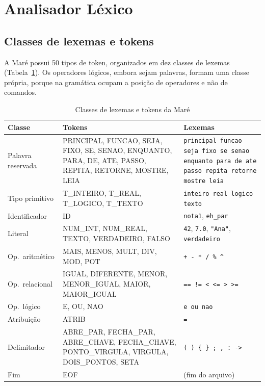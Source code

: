 \documentclass[conference]{IEEEtran}
\begin{document}
\section{Analisador Léxico}\label{sec:lex}

\subsection{Classes de lexemas e tokens}
A Maré possui 50 tipos de token, organizados em dez classes de lexemas
(Tabela~\ref{tab:tokens}). Os operadores lógicos, embora sejam palavras,
formam uma classe própria, porque na gramática ocupam a posição de operadores
e não de comandos.

\begin{table}[!t]
\caption{Classes de lexemas e tokens da Maré}\label{tab:tokens}
\centering\scriptsize
\setlength{\tabcolsep}{3pt}
\begin{tabular}{@{}>{\raggedright\arraybackslash}p{1.75cm}>{\raggedright\arraybackslash}p{3.3cm}>{\raggedright\arraybackslash}p{2.75cm}@{}}
\toprule
\textbf{Classe} & \textbf{Tokens} & \textbf{Lexemas} \\
\midrule
Palavra reservada & PRINCIPAL, FUNCAO, SEJA, FIXO, SE, SENAO, ENQUANTO,
  PARA, DE, ATE, PASSO, REPITA, RETORNE, MOSTRE, LEIA
  & \texttt{principal funcao seja fixo se senao enquanto para de ate passo
  repita retorne mostre leia} \\
Tipo primitivo & T\_INTEIRO, T\_REAL, T\_LOGICO, T\_TEXTO
  & \texttt{inteiro real logico texto} \\
Identificador & ID & \texttt{nota1}, \texttt{eh\_par} \\
Literal & NUM\_INT, NUM\_REAL, TEXTO, VERDADEIRO, FALSO
  & \texttt{42}, \texttt{7.0}, \texttt{"Ana"}, \texttt{verdadeiro} \\
Op.\ aritmético & MAIS, MENOS, MULT, DIV, MOD, POT & \texttt{+ - * / \% \^{}} \\
Op.\ relacional & IGUAL, DIFERENTE, MENOR, MENOR\_IGUAL, MAIOR, MAIOR\_IGUAL
  & \texttt{== != < <= > >=} \\
Op.\ lógico & E, OU, NAO & \texttt{e ou nao} \\
Atribuição & ATRIB & \texttt{=} \\
Delimitador & ABRE\_PAR, FECHA\_PAR, ABRE\_CHAVE, FECHA\_CHAVE,
  PONTO\_VIRGULA, VIRGULA, DOIS\_PONTOS, SETA
  & \texttt{( ) \{ \} ; , : ->} \\
Fim & EOF & (fim do arquivo) \\
\bottomrule
\end{tabular}
\end{table}
\end{document}
